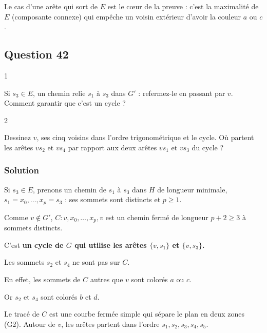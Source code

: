 \documentclass[11pt,a4paper]{article}
\begin{document}
\begin{piege}

Le cas d'une arête qui sort de \(E\) est le cœur de la preuve : c'est la maximalité de \(E\) (composante connexe) qui empêche un voisin extérieur d'avoir la couleur \(a\) ou \(c\).

\end{piege}

\hypertarget{question-42}{%
\subsection{Question 42}\label{question-42}}

\begin{indication}{1}

Si \(s_3 \in E\), un chemin relie \(s_1\) à \(s_3\) dans \(G'\) : refermez-le en passant par \(v\). Comment garantir que c'est un cycle ?

\end{indication}

\begin{indication}{2}

Dessinez \(v\), ses cinq voisins dans l'ordre trigonométrique et le cycle. Où partent les arêtes \(vs_2\) et \(vs_4\) par rapport aux deux arêtes \(vs_1\) et \(vs_3\) du cycle ?

\end{indication}

\hypertarget{solution-41}{%
\subsubsection{Solution}\label{solution-41}}

Si \(s_3 \in E\), prenons un chemin de \(s_1\) à \(s_3\) dans \(H\) de longueur minimale, \(s_1 = x_0, \dots, x_p = s_3\) : ses sommets sont distincts et \(p \ge 1\).

Comme \(v \notin G'\), \(C : v, x_0, \dots, x_p, v\) est un chemin fermé de longueur \(p + 2 \ge 3\) à sommets distincts.

C'est \textbf{un cycle de \(G\) qui utilise les arêtes \(\{v, s_1\}\) et \(\{v, s_3\}\).}

Les sommets \(s_2\) et \(s_4\) ne sont pas sur \(C\).

En effet, les sommets de \(C\) autres que \(v\) sont colorés \(a\) ou \(c\).

Or \(s_2\) et \(s_4\) sont colorés \(b\) et \(d\).

Le tracé de \(C\) est une courbe fermée simple qui sépare le plan en deux zones (G2). Autour de \(v\), les arêtes partent dans l'ordre \(s_1, s_2, s_3, s_4, s_5\).
\end{document}
